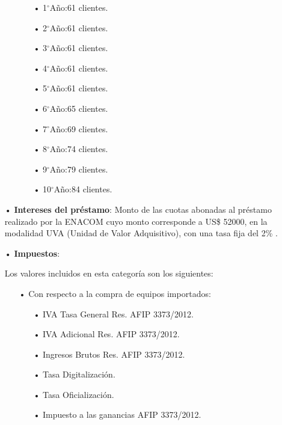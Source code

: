 \begin{enumerate}
\begin{enumerate}
\begin{enumerate}
\item[•]1$^{\circ}$Año:61 clientes.
\item[•]2$^{\circ}$Año:61 clientes.
\item[•]3$^{\circ}$Año:61 clientes.
\item[•]4$^{\circ}$Año:61 clientes.
\item[•]5$^{\circ}$Año:61 clientes.
\item[•]6$^{\circ}$Año:65 clientes.
\item[•]7$^{\circ}$Año:69 clientes.
\item[•]8$^{\circ}$Año:74 clientes.
\item[•]9$^{\circ}$Año:79 clientes.
\item[•]10$^{\circ}$Año:84 clientes.
\end{enumerate}





\end{enumerate}



\item[•]\textbf{Intereses del préstamo}:
Monto de las cuotas abonadas al préstamo realizado por la ENACOM cuyo monto corresponde a US\$ 52000, en la modalidad UVA (Unidad de Valor Adquisitivo), con una tasa fija del 2\% .


%




\item[•]\textbf{Impuestos}:

Los valores incluidos en esta categoría son los siguientes:
\begin{enumerate}
\item[•]Con respecto a la compra de equipos importados:
\begin{enumerate}
\item[•]IVA Tasa General Res. AFIP 3373/2012.
\item[•]IVA Adicional Res. AFIP 3373/2012.
\item[•]Ingresos Brutos Res. AFIP 3373/2012.
\item[•]Tasa Digitalización.
\item[•]Tasa Oficialización.
\item[•]Impuesto a las ganancias AFIP 3373/2012.
\end{enumerate}


\end{enumerate}
\end{enumerate}
